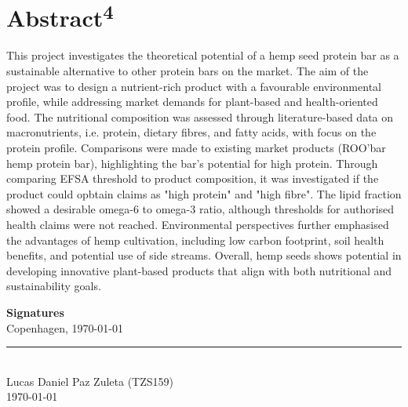 \section*{Abstract\textsuperscript{4}}
This project investigates the theoretical potential of a hemp seed protein bar as a sustainable alternative to other protein bars on the market. The aim of the project was to design a nutrient-rich product with a favourable environmental profile, while addressing market demands for plant-based and health-oriented food. The nutritional composition was assessed through literature-based data on macronutrients, i.e. protein, dietary fibres, and fatty acids, with focus on the protein profile. Comparisons were made to existing market products (ROO'bar hemp protein bar), highlighting the bar's potential for high protein. Through comparing EFSA threshold to product composition, it was investigated if the product could opbtain claims as "high protein" and "high fibre". The lipid fraction showed a desirable omega-6 to omega-3 ratio, although thresholds for authorised health claims were not reached. Environmental perspectives further emphasised the advantages of hemp cultivation, including low carbon footprint, soil health benefits, and potential use of side streams. Overall, hemp seeds shows potential in developing innovative plant-based products that align with both nutritional and sustainability goals.


\vspace{2em}
\begin{center}
    \textbf{Signatures}\\[0.5em]
    {\small Copenhagen, \today}
    \end{center}
    
    \vspace{2.5em}
    
    \noindent
    \begin{minipage}[t]{0.48\textwidth}
      \rule{\linewidth}{0.4pt}\\[-0.2em]
      Lucas Daniel Paz Zuleta (TZS159)\\
      {\small \today}
    \end{minipage}\hfill
    
    \vspace{7em}
    
    \noindent
